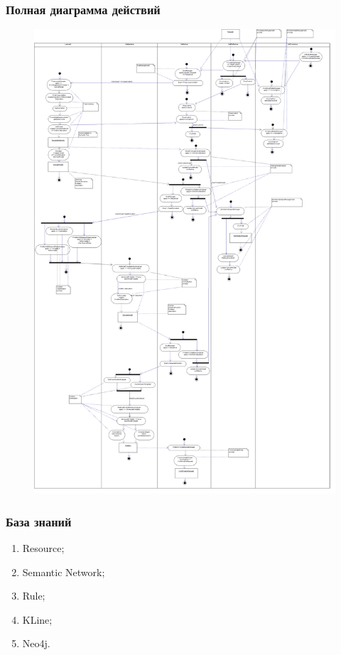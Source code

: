 \documentclass[14pt]{beamer}
\begin{document}
\begin{frame}
\frametitle{Полная диаграмма действий}
\begin{figure} [h] 
  \center
  \includegraphics [scale=0.05] {LifecycleActivity}
  \label{img:LifecycleActivity}  
\end{figure}
\end{frame}

\begin{frame}
\frametitle{База знаний}
\begin{enumerate}
	\item Resource;
	\item Semantic Network;
	\item Rule;
	\item KLine;
	\item Neo4j.
\end{enumerate}
\end{frame}
\end{document}
